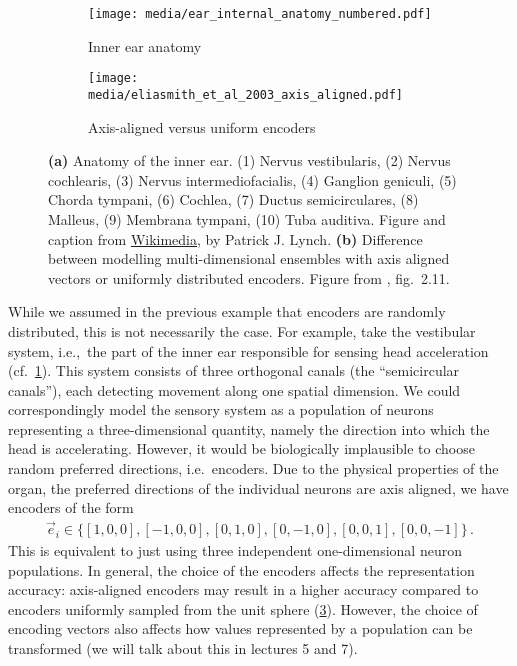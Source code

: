 \documentclass[10pt,letterpaper,oneside]{article}
\begin{document}
\begin{figure}
	\begin{subfigure}[b]{0.5\textwidth}
		\centering
		\texttt{[image: media/ear\_internal\_anatomy\_numbered.pdf]}
		\caption{Inner ear anatomy}
		\label{fig:ear_internal_anatomy_numbered}
	\end{subfigure}
	\begin{subfigure}[b]{0.5\textwidth}
		\centering
		\texttt{[image: media/eliasmith\_et\_al\_2003\_axis\_aligned.pdf]}
		\caption{Axis-aligned versus uniform encoders}
		\label{fig:eliasmith_et_al_2003_axis_aligned}
	\end{subfigure}
	\caption{\textbf{(a)} Anatomy of the inner ear. (1) Nervus vestibularis, (2) Nervus cochlearis, (3) Nervus intermediofacialis, (4) Ganglion geniculi, (5) Chorda tympani, (6) Cochlea, (7) Ductus semicirculares, (8) Malleus, (9) Membrana tympani, (10) Tuba auditiva. Figure and caption from \href{https://commons.wikimedia.org/wiki/File:Ear_internal_anatomy_numbered.svg}{Wikimedia}, by Patrick J. Lynch. \textbf{(b)} Difference between modelling multi-dimensional ensembles with axis aligned vectors or uniformly distributed encoders. Figure from \cite{eliasmith2003neural}, fig.~2.11.}
\end{figure}

While we assumed in the previous example that encoders are randomly distributed, this is not necessarily the case. For example, take the vestibular system, i.e.,~the part of the inner ear responsible for sensing head acceleration (cf.~\cref{fig:ear_internal_anatomy_numbered}). This system consists of three orthogonal canals (the \enquote{semicircular canals}), each detecting movement along one spatial dimension.  We could correspondingly model the sensory system as a population of neurons representing a three-dimensional quantity, namely the direction into which the head is accelerating. However, it would be biologically implausible to choose random preferred directions, i.e.~encoders. Due to the physical properties of the organ, the preferred directions of the individual neurons are axis aligned, we have encoders of the form
\begin{align*}
	\vec e_i \in \big\{ [1, 0, 0], [-1, 0, 0], [0, 1, 0], [0, -1, 0], [0, 0, 1], [0, 0, -1] \big\} \,.
\end{align*}
This is equivalent to just using three independent one-dimensional neuron populations. In general, the choice of the encoders affects the representation accuracy: axis-aligned encoders may result in a higher accuracy compared to encoders uniformly sampled from the unit sphere (\cref{fig:eliasmith_et_al_2003_axis_aligned}). However, the choice of encoding vectors also affects how values represented by a population can be transformed (we will talk about this in lectures 5 and 7).


\printbibliography
\end{document}
